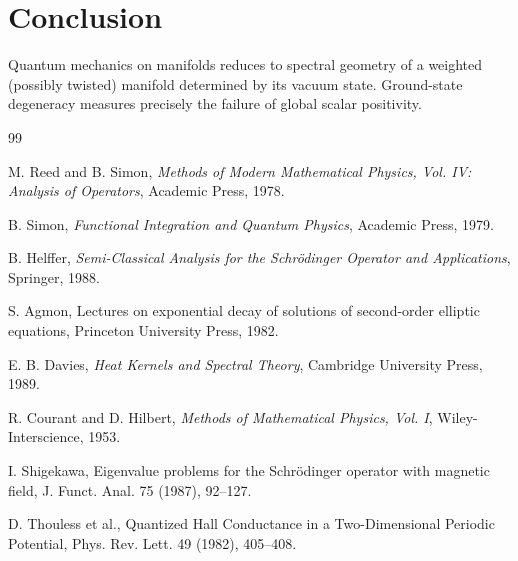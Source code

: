 \documentclass[11pt]{article}
\begin{document}
\section{Conclusion}

Quantum mechanics on manifolds reduces to spectral geometry of a weighted 
(possibly twisted) manifold determined by its vacuum state. 
Ground-state degeneracy measures precisely the failure of global scalar positivity.

\begin{thebibliography}{99}

M. Reed and B. Simon,
\textit{Methods of Modern Mathematical Physics, Vol. IV: Analysis of Operators},
Academic Press, 1978.

B. Simon,
\textit{Functional Integration and Quantum Physics},
Academic Press, 1979.

B. Helffer,
\textit{Semi-Classical Analysis for the Schrödinger Operator and Applications},
Springer, 1988.

S. Agmon,
Lectures on exponential decay of solutions of second-order elliptic equations,
Princeton University Press, 1982.

E. B. Davies,
\textit{Heat Kernels and Spectral Theory},
Cambridge University Press, 1989.

R. Courant and D. Hilbert,
\textit{Methods of Mathematical Physics, Vol. I},
Wiley-Interscience, 1953.

I. Shigekawa,
Eigenvalue problems for the Schrödinger operator with magnetic field,
J. Funct. Anal. 75 (1987), 92–127.

D. Thouless et al.,
Quantized Hall Conductance in a Two-Dimensional Periodic Potential,
Phys. Rev. Lett. 49 (1982), 405–408.

\end{thebibliography}
\end{document}
